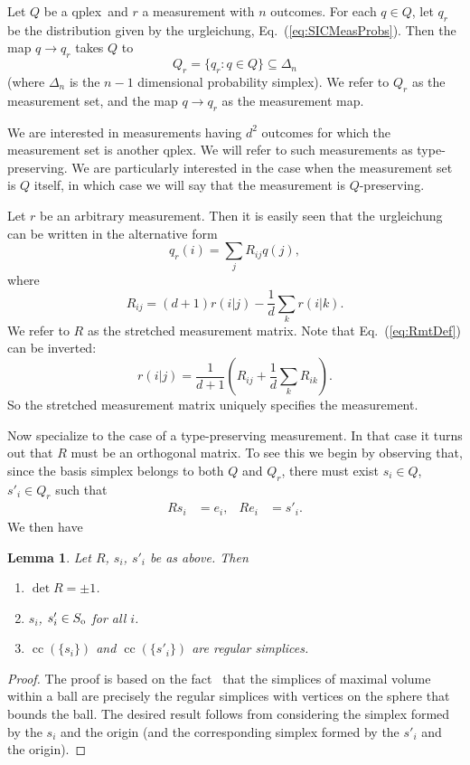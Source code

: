 \documentclass[aps,pra,superscriptaddress,10pt,tightenlines,twocolumn,nofootinbib]{revtex4}
\newtheorem{lemma}[theorem]{Lemma}
\theoremstyle{remark}
\newcommand{\be}{\begin{equation}}
\newcommand{\ee}{\end{equation}}
\newcommand{\ea}[1]{\begin{align}#1\end{align}}
\newcommand{\so}{S_{\rm{o}}}
\newcommand{\qp}{Q}
\newcommand{\qplex}{qplex}
\DeclareMathOperator{\cc}{cc}
\begin{document}
Let $\qp$ be a \qplex\ and $r$ a measurement with $n$ outcomes.  For each $q\in \qp$, let $q_r$ be the distribution given by the urgleichung, Eq.~(\ref{eq:SICMeasProbs}).  Then the map $q \to q_r$ takes $\qp$ to
\be
\qp_r = \{q_r \colon q\in \qp\} \subseteq \Delta_n
\ee
(where  $\Delta_n$ is the $n-1$ dimensional probability simplex). We refer to $\qp_r$ as the measurement set, and the map $q\to q_r$ as the measurement map.

We are interested in  measurements having $d^2$ outcomes for which the measurement set is another \qplex.  We will refer to such measurements as type-preserving.  We are particularly interested in the case when the measurement set is $\qp$ itself, in which case we will say that the measurement is $\qp$-preserving.

Let $r$ be an arbitrary measurement.  Then it is easily seen that the urgleichung can  be written in the alternative  form
\be
q_r(i) = \sum_j R_{ij} q(j),
\ee
where
\be
R_{ij} = (d+1) r(i|j) -\frac{1}{d} \sum_k r(i|k).
\label{eq:RmtDef}
\ee
We refer to $R$ as the stretched measurement matrix. Note that Eq.~(\ref{eq:RmtDef}) can be inverted:
\be
r(i|j) = \frac{1}{d+1} \left( R_{ij} + \frac{1}{d} \sum_k R_{ik}\right).
\ee
So the stretched measurement matrix uniquely specifies the measurement.


Now specialize to the case of a type-preserving measurement.  In that case it turns out that   $R$ must be an orthogonal matrix.  To see this we begin by observing that, since the basis simplex belongs to both $\qp$ and $\qp_r$, there must exist  $s_i \in \qp$, $s'_i\in \qp_r$ such that
\ea{
Rs_i &= e_i, &  Re_i &= s'_i.
\label{eq:sspdef}
}
We then have
\begin{lemma}
\label{lm:typPMeasDetREq1}
Let $R$, $s_i$, $s'_i$ be as above.  Then
\begin{enumerate}
\item $\det R  = \pm 1$.
\item $s_i$, $s'_i\in \so$ for all $i$.
\item $\cc(\{s_i\})$ and $\cc(\{s'_i\})$ are regular simplices.
\end{enumerate}
\end{lemma}
\begin{proof}
The proof is based on the fact~\cite{VolSimp} that the simplices of maximal volume within a ball are precisely the regular simplices with vertices on the sphere that bounds the ball.  The desired result follows from considering the simplex formed by the $s_i$ and the origin (and the corresponding simplex formed by the $s'_i$ and the origin).
\end{proof}
\end{document}

